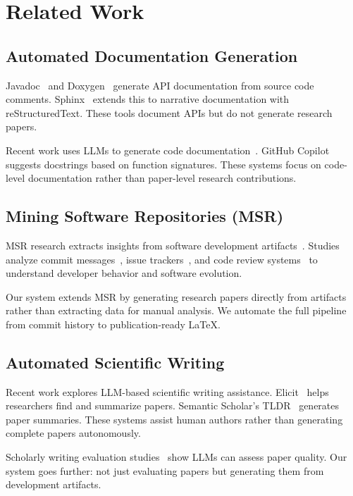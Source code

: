 \section{Related Work}
\label{sec:related}

\subsection{Automated Documentation Generation}

Javadoc~\cite{kramer1999javadoc} and Doxygen~\cite{doxygen2023} generate API documentation from source code comments. Sphinx~\cite{sphinx2023} extends this to narrative documentation with reStructuredText. These tools document APIs but do not generate research papers.

Recent work uses LLMs to generate code documentation~\cite{chen2021codex}. GitHub Copilot~\cite{chen2021evaluating} suggests docstrings based on function signatures. These systems focus on code-level documentation rather than paper-level research contributions.

\subsection{Mining Software Repositories (MSR)}

MSR research extracts insights from software development artifacts~\cite{hassan2008road}. Studies analyze commit messages~\cite{mockus2000identifying}, issue trackers~\cite{bird2009promises}, and code review systems~\cite{rigby2013convergent} to understand developer behavior and software evolution.

Our system extends MSR by generating research papers directly from artifacts rather than extracting data for manual analysis. We automate the full pipeline from commit history to publication-ready LaTeX.

\subsection{Automated Scientific Writing}

Recent work explores LLM-based scientific writing assistance. Elicit~\cite{elicit2023} helps researchers find and summarize papers. Semantic Scholar's TLDR~\cite{cachola2020tldr} generates paper summaries. These systems assist human authors rather than generating complete papers autonomously.

Scholarly writing evaluation studies~\cite{yuan2024llm} show LLMs can assess paper quality. Our system goes further: not just evaluating papers but generating them from development artifacts.

